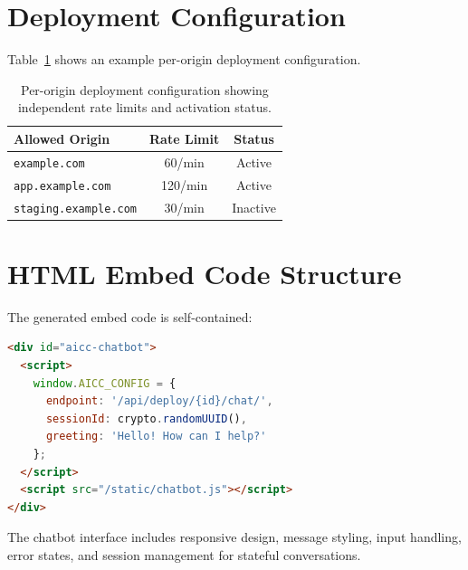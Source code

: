 \documentclass[11pt]{article}
\begin{document}
\section{Deployment Configuration}
\label{app:deployment-config}

Table~\ref{tab:deployment-origins} shows an example per-origin deployment configuration.

\begin{table}[h]
\centering
\small
\begin{tabular}{lcc}
\toprule
\textbf{Allowed Origin} & \textbf{Rate Limit} & \textbf{Status} \\
\midrule
\texttt{example.com} & 60/min & Active \\
\texttt{app.example.com} & 120/min & Active \\
\texttt{staging.example.com} & 30/min & Inactive \\
\bottomrule
\end{tabular}
\caption{Per-origin deployment configuration showing independent rate limits and activation status.}
\label{tab:deployment-origins}
\end{table}


\section{HTML Embed Code Structure}
\label{app:embed-code}

The generated embed code is self-contained:

\begin{lstlisting}[language=HTML,caption={Generated HTML embed code structure}]
<div id="aicc-chatbot">
  <script>
    window.AICC_CONFIG = {
      endpoint: '/api/deploy/{id}/chat/',
      sessionId: crypto.randomUUID(),
      greeting: 'Hello! How can I help?'
    };
  </script>
  <script src="/static/chatbot.js"></script>
</div>
\end{lstlisting}

The chatbot interface includes responsive design, message styling, input handling, error states, and session management for stateful conversations.
\end{document}
